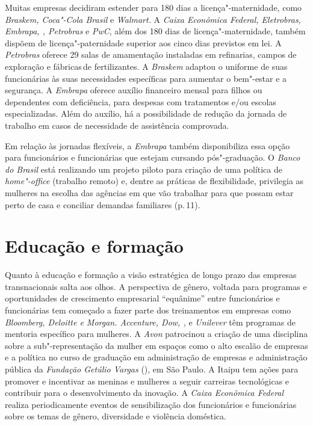Muitas empresas decidiram estender para 180 dias a licença"-maternidade,
como \emph{Braskem, Coca"-Cola Brasil} e \emph{Walmart.} A \emph{Caixa
Econômica Federal, Eletrobras, Embrapa, , Petrobras} e \emph{PwC},
além dos 180 dias de licença"-maternidade, também dispõem de
licença"-paternidade superior aos cinco dias previstos em lei. A
\emph{Petrobras} oferece 29 salas de amamentação instaladas
em refinarias, campos de exploração e fábricas\,de fertilizantes. A
\emph{Braskem} adaptou o uniforme de suas funcionárias às suas
necessidades específicas para aumentar o bem"-estar e a segurança. A
\emph{Embrapa} oferece auxílio financeiro mensal para filhos ou
dependentes com deficiência, para despesas com tratamentos e/ou
escolas especializadas. Além do auxílio, há a possibilidade de redução
da jornada de trabalho em casos de necessidade de assistência
comprovada.

Em relação às jornadas flexíveis, a \emph{Embrapa} também disponibiliza
essa opção para funcionários e funcionárias que estejam cursando
pós"-graduação. O \emph{Banco do Brasil} está realizando um projeto
piloto para criação de uma política de \emph{home"-office} (trabalho
remoto) e, dentre as práticas de flexibilidade, privilegia as mulheres
na escolha das agências em que vão trabalhar para que possam estar perto
de casa e conciliar demandas familiares (p.\,11).

\section{Educação e formação}

Quanto à educação e formação a visão estratégica de longo prazo das
empresas transnacionais salta aos olhos. A perspectiva de gênero,
voltada para programas e oportunidades de crescimento empresarial
``equânime'' entre funcionários e funcionárias tem começado a fazer
parte dos treinamentos em empresas como \emph{Bloomberg, Deloitte e 
Morgan. Accenture, Dow, , } e \emph{Unilever} têm programas de
mentoria específico para mulheres. A \emph{Avon} patrocinou a criação de
uma disciplina sobre a sub"-representação da mulher em espaços como o
alto escalão de empresas e a política no curso de graduação em
administração de empresas e administração pública da \emph{Fundação
Getúlio Vargas} (), em São Paulo. A Itaipu tem ações para promover e
incentivar as meninas e mulheres a seguir carreiras tecnológicas e
contribuir para o desenvolvimento da inovação. A \emph{Caixa Econômica
Federal} realiza periodicamente eventos de sensibilização dos
funcionários e funcionárias sobre os temas de gênero, diversidade e
violência doméstica.

